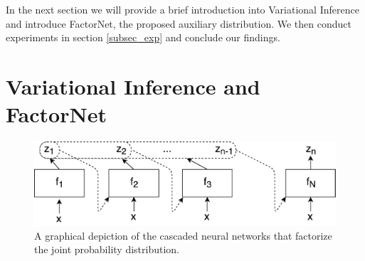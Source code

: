 In the next section we will provide a brief introduction into Variational Inference and introduce FactorNet, the proposed auxiliary distribution. We then conduct experiments in section \ref{subsec_exp} and conclude our findings.

\section{Variational Inference and FactorNet}

\begin{figure}
\centering
\includegraphics[width=0.9\linewidth]{factornet/factornet.pdf}
\caption[FactorNet: A graphical depiction of the cascaded neural networks that factorize the joint probability distribution.]{A graphical depiction of the cascaded neural networks that factorize the joint probability distribution.}
\label{fnet:neuralnets}
\end{figure}


